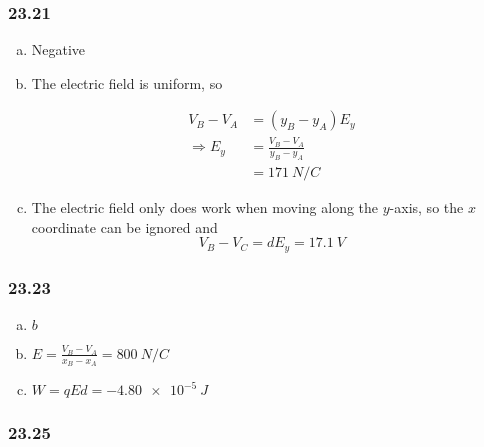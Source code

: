 \documentclass{article}
\begin{document}
\subsubsection{23.21}

\begin{enumerate}[a)]
  \item Negative

  \item The electric field is uniform, so

        \begin{align*}
          V_B - V_A       & = (y_B - y_A) E_y             \\
          \Rightarrow E_y & = \frac{V_B - V_A}{y_B - y_A} \\
                          & = \qty{171}{N/C}
        \end{align*}

  \item The electric field only does work when moving along the $y$-axis, so the $x$ coordinate can be ignored and \[V_B - V_C = d E_y = \qty{17.1}{V}\]
\end{enumerate}

\subsubsection{23.23}

\begin{enumerate}[a)]
  \item $b$

  \item $E = \frac{V_B - V_A}{x_B - x_A} = \qty{800}{N/C}$

  \item $W = q E d = \qty{-4.80e-5}{J}$
\end{enumerate}

\subsubsection{23.25}
\end{document}
